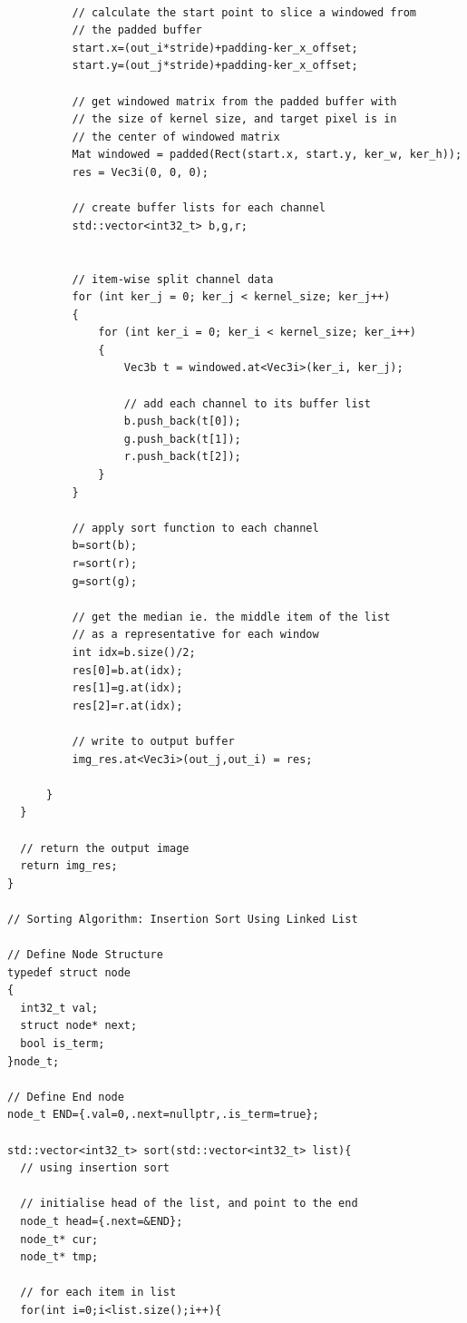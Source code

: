 \documentclass[12pt,a4paper]{report}
\begin{document}
\begin{lstlisting}
          
          // calculate the start point to slice a windowed from 
          // the padded buffer
          start.x=(out_i*stride)+padding-ker_x_offset;
          start.y=(out_j*stride)+padding-ker_x_offset;

          // get windowed matrix from the padded buffer with 
          // the size of kernel size, and target pixel is in
          // the center of windowed matrix
          Mat windowed = padded(Rect(start.x, start.y, ker_w, ker_h));
          res = Vec3i(0, 0, 0);

          // create buffer lists for each channel
          std::vector<int32_t> b,g,r;


          // item-wise split channel data             
          for (int ker_j = 0; ker_j < kernel_size; ker_j++)
          {
              for (int ker_i = 0; ker_i < kernel_size; ker_i++)
              {
                  Vec3b t = windowed.at<Vec3i>(ker_i, ker_j);
              
                  // add each channel to its buffer list
                  b.push_back(t[0]);
                  g.push_back(t[1]);
                  r.push_back(t[2]);
              }
          }
          
          // apply sort function to each channel
          b=sort(b);
          r=sort(r);
          g=sort(g);

          // get the median ie. the middle item of the list
          // as a representative for each window
          int idx=b.size()/2;
          res[0]=b.at(idx);
          res[1]=g.at(idx);
          res[2]=r.at(idx);

          // write to output buffer
          img_res.at<Vec3i>(out_j,out_i) = res;
          
      }
  }

  // return the output image
  return img_res;
}

// Sorting Algorithm: Insertion Sort Using Linked List

// Define Node Structure
typedef struct node
{
  int32_t val;
  struct node* next;
  bool is_term;
}node_t;

// Define End node
node_t END={.val=0,.next=nullptr,.is_term=true};

std::vector<int32_t> sort(std::vector<int32_t> list){
  // using insertion sort

  // initialise head of the list, and point to the end
  node_t head={.next=&END};
  node_t* cur;
  node_t* tmp;

  // for each item in list
  for(int i=0;i<list.size();i++){


\end{lstlisting}
\end{document}
